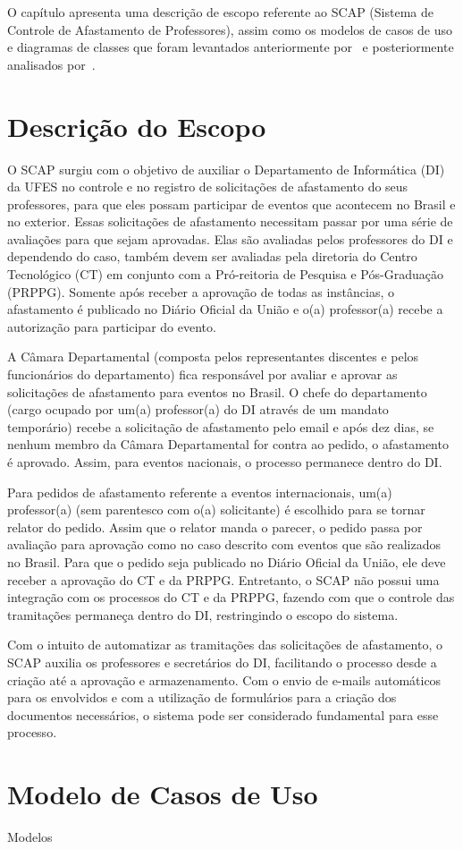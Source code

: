 O capítulo apresenta uma descrição de escopo referente ao SCAP (Sistema de Controle de Afastamento de Professores), assim como os modelos de casos de uso e diagramas de classes que foram levantados anteriormente por~ e posteriormente analisados por~. 

\section{Descrição do Escopo}
\label{sec-requisitos-descricao-escopo}

O SCAP surgiu com o objetivo de auxiliar o Departamento de Informática (DI) da UFES no controle e no registro de solicitações de afastamento do seus professores, para que eles possam participar de eventos que acontecem no Brasil e no exterior. Essas solicitações de afastamento necessitam passar por uma série de avaliações para que sejam aprovadas. Elas são avaliadas pelos professores do DI e dependendo do caso, também devem ser avaliadas pela diretoria do Centro Tecnológico (CT) em conjunto com a Pró-reitoria de Pesquisa e Pós-Graduação (PRPPG). Somente após receber a aprovação de todas as instâncias, o afastamento é publicado no Diário Oficial da União e o(a) professor(a) recebe a autorização para participar do evento.     

A Câmara Departamental (composta pelos representantes discentes e pelos funcionários do departamento) fica responsável por avaliar e aprovar as solicitações de afastamento para eventos no Brasil. O chefe do departamento (cargo ocupado por um(a) professor(a) do DI através de um mandato temporário) recebe a solicitação de afastamento pelo email e após dez dias, se nenhum membro da Câmara Departamental for contra ao pedido, o afastamento é aprovado. Assim, para eventos nacionais, o processo permanece dentro do DI.

Para pedidos de afastamento referente a eventos internacionais, um(a) professor(a) (sem parentesco com o(a) solicitante) é escolhido para se tornar relator do pedido. Assim que o relator manda o parecer, o pedido passa por avaliação para aprovação como no caso descrito com eventos que são realizados no Brasil. Para que o pedido seja publicado no Diário Oficial da União, ele deve receber a aprovação do CT e da PRPPG. Entretanto, o SCAP não possui uma integração com os processos do CT e da PRPPG, fazendo com que o controle das tramitações permaneça dentro do DI, restringindo o escopo do sistema.

Com o intuito de automatizar as tramitações das solicitações de afastamento, o SCAP auxilia os professores e secretários do DI, facilitando o processo desde a criação até a aprovação e armazenamento. Com o envio de e-mails automáticos para os envolvidos e com a utilização de formulários para a criação dos documentos necessários, o sistema pode ser considerado fundamental para esse processo.      

\section{Modelo de Casos de Uso}
\label{sec-requisitos-modelo-caso-uso}

Modelos



 
